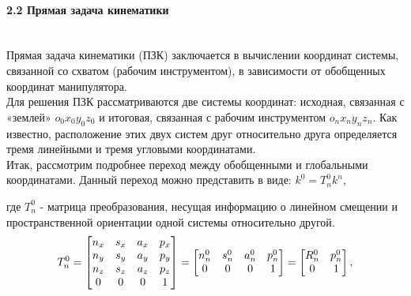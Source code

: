 \paragraph*{2.2 Прямая задача кинематики}$\phantom{-}$\\
\hspace*{\parindent} Прямая задача кинематики (ПЗК) заключается в вычислении координат системы, связанной со схватом (рабочим инструментом), в зависимости от обобщенных координат манипулятора.\\
\hspace*{\parindent}Для решения ПЗК рассматриваются две системы координат: исходная, связанная с «землей» $o_0 x_0 y_0 z_0$ и итоговая, связанная с рабочим инструментом $o_n x_n y_n z_n$. Как известно, расположение этих двух систем друг относительно друга определяется тремя линейными и тремя угловыми координатами.\\
\hspace*{\parindent}Итак, рассмотрим подробнее переход между обобщенными и глобальными координатами. Данный переход можно представить в виде: $k^0 = T_n^0 k^n$, 

где $T_n^0$ - матрица преобразования, несущая информацию о линейном смещении и пространственной ориентации одной системы относительно другой.\\


\begin{equation*}\label{eq:model}
T_n^0=
    \begin{bmatrix}
    n_x & s_x & a_x & p_x \\
    n_y & s_y & a_y & p_y \\
    n_z & s_z & a_z & p_z \\
    0 & 0 & 0 & 1 \\
    \end{bmatrix}
    =
     \begin{bmatrix}
    n_n^0  &  s_n^0 & a_n^0 & p_n^0 \\
    0 & 0 & 0 & 1\\
    \end{bmatrix}
     =
     \begin{bmatrix}
    R_n^0  &  p_n^0 \\
     0 & 1\\
    \end{bmatrix}
    ,\\
\end{equation*} 

